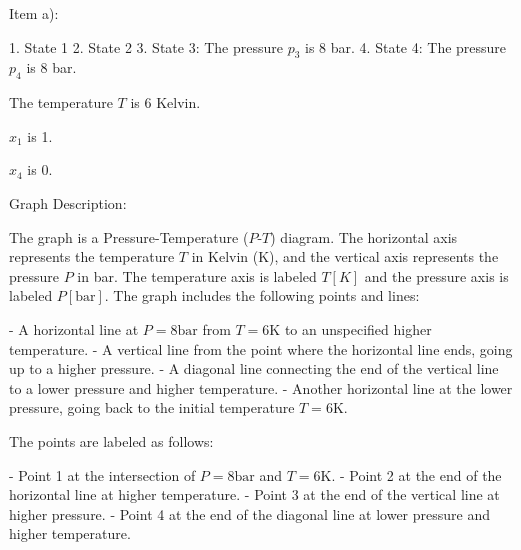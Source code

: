 Item a):

1. State 1
2. State 2
3. State 3: The pressure \( p_3 \) is 8 bar.
4. State 4: The pressure \( p_4 \) is 8 bar.

The temperature \( T \) is 6 Kelvin.

\( x_1 \) is 1.

\( x_4 \) is 0.

Graph Description:

The graph is a Pressure-Temperature (\( P \)-\( T \)) diagram. The horizontal axis represents the temperature \( T \) in Kelvin (K), and the vertical axis represents the pressure \( P \) in bar. The temperature axis is labeled \( T [K] \) and the pressure axis is labeled \( P [\text{bar}] \). The graph includes the following points and lines:

- A horizontal line at \( P = 8 \text{bar} \) from \( T = 6 \text{K} \) to an unspecified higher temperature.
- A vertical line from the point where the horizontal line ends, going up to a higher pressure.
- A diagonal line connecting the end of the vertical line to a lower pressure and higher temperature.
- Another horizontal line at the lower pressure, going back to the initial temperature \( T = 6 \text{K} \).

The points are labeled as follows:

- Point 1 at the intersection of \( P = 8 \text{bar} \) and \( T = 6 \text{K} \).
- Point 2 at the end of the horizontal line at higher temperature.
- Point 3 at the end of the vertical line at higher pressure.
- Point 4 at the end of the diagonal line at lower pressure and higher temperature.